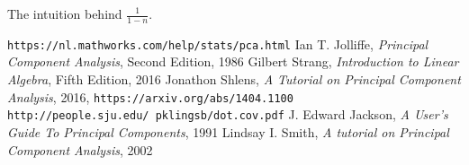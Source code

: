 \documentclass[10pt,twocolumn]{article}
\begin{document}
The intuition behind $\frac{1}{1-n}$.

\thebibliography{}

 \texttt{https://nl.mathworks.com/help/stats/pca.html}
 Ian T. Jolliffe, \textit{Principal Component Analysis}, Second Edition, 1986
 Gilbert Strang, \textit{Introduction to Linear Algebra}, Fifth Edition, 2016
 Jonathon Shlens, \textit{A Tutorial on Principal Component Analysis}, 2016, \texttt{https://arxiv.org/abs/1404.1100}
 \texttt{http://people.sju.edu/~pklingsb/dot.cov.pdf}
 J. Edward Jackson, \textit{A User's Guide To Principal Components}, 1991
 Lindsay I. Smith, \textit{A tutorial on Principal Component Analysis}, 2002
\end{document}
